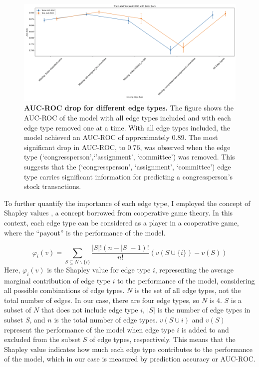 \documentclass[15pt,letterpaper]{article}
\begin{document}
\begin{figure}[h!]
  \centering
  \includegraphics[width=1.1\textwidth, height=0.4\textheight]{imgs/auc2.png}
  \caption{\textbf{AUC-ROC drop for different edge types.} The figure shows the AUC-ROC of the model with all edge types included and with each edge type removed one at a time. With all edge types included, the model achieved an AUC-ROC of approximately 0.89. The most significant drop in AUC-ROC, to 0.76, was observed when the edge type (`congressperson',`'assignment', `committee') was removed. This suggests that the (`congressperson', `assignment', `committee') edge type carries significant information for predicting a congressperson's stock transactions.}
  \label{fig:auc_roc_drop}
\end{figure}

To further quantify the importance of each edge type, I employed the concept of Shapley values \citep{shapley1,shapley2,shapley3}, a concept borrowed from cooperative game theory. In this context, each edge type can be considered as a player in a cooperative game, where the ``payout'' is the performance of the model.

$$
\varphi_i(v)=\sum_{S \subseteq N \backslash\{i\}} \frac{|S| !(n-|S|-1) !}{n !}(v(S \cup\{i\})-v(S))
$$
Here, $\varphi_i(v)$ is the Shapley value for edge type $i$, representing the average marginal contribution of edge type $i$ to the performance of the model, considering all possible combinations of edge types. $N$ is the set of all edge types, not the total number of edges. In our case, there are four edge types, so $N$ is 4. $S$ is a subset of $N$ that does not include edge type $i$, $|S|$ is the number of edge types in subset $S$, and $n$ is the total number of edge types. $v(S \cup{i})$ and $v(S)$ represent the performance of the model when edge type $i$ is added to and excluded from the subset $S$ of edge types, respectively. This means that the Shapley value indicates how much each edge type contributes to the performance of the model, which in our case is measured by prediction accuracy or AUC-ROC.
\end{document}

